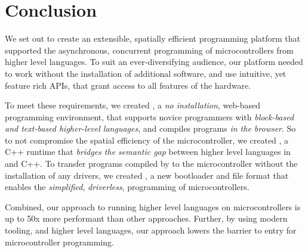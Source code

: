 \section{Conclusion}
\label{sec:conclude}

We set out to create an extensible, spatially efficient programming platform that supported the asynchronous, concurrent programming of microcontrollers from higher level languages. To suit an ever-diversifying audience, our platform needed to work without the installation of additional software, and use intuitive, yet feature rich APIs, that grant access to all features of the hardware.

To meet these requirements, we created \MCN, a \emph{no installation}, web-based programming environment, that supports novice programmers with \emph{block-based and text-based higher-level languages}, and compiles programs \emph{in the browser}. So to not compromise the spatial efficiency of the microcontroller, we created \CON, a C++ runtime that \emph{bridges the semantic gap} between higher level languages in \MC and C++. To transfer programs compiled by \MC to the microcontroller without the installation of any drivers, we created \UFN, a new bootloader and file format that enables the \emph{simplified}, \emph{driverless}, programming of microcontrollers.

Combined, our approach to running higher level languages on microcontrollers is up to 50x more performant than other approaches. Further, by using modern tooling, and higher level languages, our approach lowers the barrier to entry for microcontroller programming.


